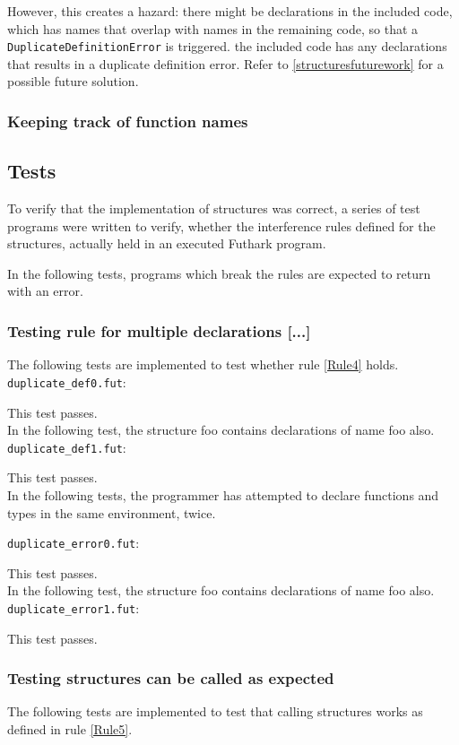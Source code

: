 However, this creates a hazard: there might be declarations in the included
code, which has names that overlap with names in the remaining code, so that a
\texttt{DuplicateDefinitionError} is triggered. the included code has any declarations
that results in a duplicate definition error. Refer to
\ref{structuresfuturework} for a possible future solution.

\subsubsection{Keeping track of function names}



\subsection{Tests}
\label{subsec:structuretests}
To verify that the implementation of structures was correct, a series of test
programs were written to verify, whether the interference rules defined for the
structures, actually held in an executed Futhark program.

In the following tests, programs which break the rules are expected to return
with an error.

\subsubsection{Testing rule for multiple declarations [...]}
The following tests are implemented to test whether rule \ref{Rule4} holds.
\texttt{duplicate_def0.fut}:

This test passes.
\\
In the following test, the structure foo contains declarations of name foo also.
\texttt{duplicate_def1.fut}:

This test passes.
\\
In the following tests, the programmer has attempted to declare functions and
types in the same environment, twice.

\texttt{duplicate_error0.fut}:

This test passes.
\\
In the following test, the structure foo contains declarations of name foo also.
\texttt{duplicate_error1.fut}:

This test passes.

\subsubsection{Testing structures can be called as expected}
The following tests are implemented to test that calling structures works as
defined in rule \ref{Rule5}.

